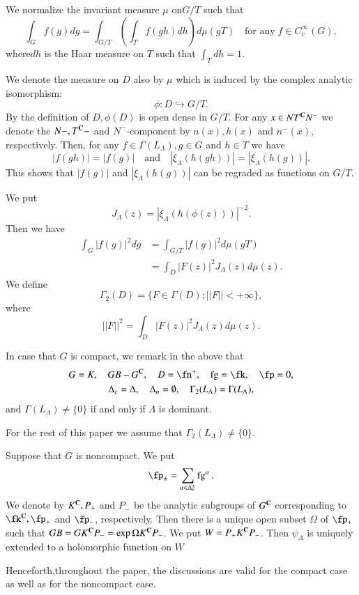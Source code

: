 We normalize the invariant measure $\mu$ on$G/T$ such that
$$
\int_{G}f(g)dg =\int_{G/T}\left(\int_{T}f(gh)dh\right)d\mu(gT) \quad \text{for any}\; f \in C_{c}^{\infty}(G),
$$
where\pageoriginale $dh$ is the Haar measure on $T$ such that $\int_{T}dh =1$.

We denote the measure on $D$ also by $\mu$ which is induced by the complex analytic isomorphism:
$$
\phi : D\hookrightarrow G/T.
$$
By the definition of $D, \phi(D)$ is open dense in $G/T$. For any $x \in NT^{\mathbf{C}}N^{-}$ we denote the $N-, T^{\mathbf{C}}-$ and $N^{-}$-component by $n(x),h(x)$ and $n^{-}(x)$, respectively. Then, for any $f \in \Gamma(L_{\Lambda}), g \in G$ and $h \in T$ we have
$$
|f(gh)|= |f(g)| \quad \text{and} \quad |\xi_{\Lambda}(h(gh))|= |\xi_{\Lambda}(h(g))|.
$$ 
This shows that $|f(g)|$ and $|\xi_{\Lambda}(h(g))|$ can be regraded as functions on $G/T$.

We put
$$
J_{\Lambda}(z) = |\xi_{\Lambda}(h(\phi(z)))|^{-2}.
$$
Then we have
\begin{align*}
\int_{G}|f(g)|^{2}dg &= \int_{G/T}|f(g)|^{2}d\mu(gT)\\
& = \int_{D}|F(z)|^{2}J_{\Lambda}(z)d\mu (z).
\end{align*}
We define
$$
\Gamma_{2}(D)= \{ F \in \Gamma (D); ||F||< +\infty\},
$$
where
$$
||F||^{2} = \int_{D}|F(z)|^{2}J_{\Lambda}(z)d\mu(z).
$$

In case that  $G$ is compact, we remark in the above that
\begin{gather*}
G=K,\quad GB-G^{\bC},\quad D =\fn^{+},\quad \fg = \fk,\quad \fp=0,\\
\Delta_{c}= \Delta,\quad \Delta_{n}= \emptyset,\quad \Gamma_{2}(L_{\Lambda})=\Gamma(L_{\Lambda}),
\end{gather*}
and $\Gamma(L_{\Lambda})\neq \{0\}$ if and only if $\Lambda$ is dominant.

For the rest of this paper we assume that $\Gamma_{2}(L_{\Lambda})\neq \{0\}$.

Suppose that $G$ is noncompact. We put
$$
\fp_{\pm}= \sum\limits_{\alpha \in \Delta_{n}^{\pm}}\fg^{\alpha}.
$$
We denote by $K^{\mathbf{C}}, P_{+}$ and $P_{-}$ be the analytic subgroups of $G^{\mathbf{C}}$ corresponding to $\fk^{\bC}, \fp_{+}$ and $\fp_{-}$, respectively. Then there is a unique open subset $\Omega$ of $\fp_{+}$ such that $GB=GK^{\mathbf{C}}P_{-}=\exp\Omega K^{\mathbf{C}}P_{-}$. We put $W=P_{+}K^{\mathbf{C}}P_{-}$. Then $\psi_{\Lambda}$ is uniquely extended to a holomorphic function on $W$

Henceforth,\pageoriginale throughout the paper, the discussions are valid for the compact case as well as for the noncompact case.

